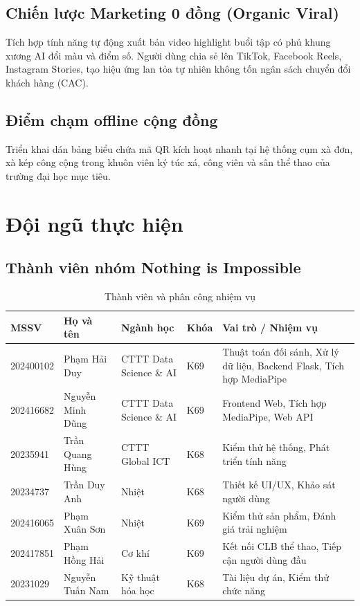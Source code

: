 \documentclass[a4paper,12pt]{article}
\begin{document}
\subsection{Chiến lược Marketing 0 đồng (Organic Viral)}
Tích hợp tính năng tự động xuất bản video highlight buổi tập có phủ khung xương AI đổi màu và điểm số. Người dùng chia sẻ lên TikTok, Facebook Reels, Instagram Stories, tạo hiệu ứng lan tỏa tự nhiên không tốn ngân sách chuyển đổi khách hàng (CAC).

\subsection{Điểm chạm offline cộng đồng}
Triển khai dán bảng biểu chứa mã QR kích hoạt nhanh tại hệ thống cụm xà đơn, xà kép công cộng trong khuôn viên ký túc xá, công viên và sân thể thao của trường đại học mục tiêu.

\section{Đội ngũ thực hiện}

\subsection{Thành viên nhóm Nothing is Impossible}
\begin{table}[H]
    \centering
    \caption{Thành viên và phân công nhiệm vụ}
    \label{tab:team}
    \begin{tabular}{p{1.8cm}p{2.5cm}p{2.8cm}p{1cm}p{5.5cm}}
        \toprule
        \textbf{MSSV} & \textbf{Họ và tên} & \textbf{Ngành học} & \textbf{Khóa} & \textbf{Vai trò / Nhiệm vụ} \\
        \midrule
        202400102 & Phạm Hải Duy & CTTT Data Science \& AI & K69 & Thuật toán đối sánh, Xử lý dữ liệu, Backend Flask, Tích hợp MediaPipe \\
        202416682 & Nguyễn Minh Dũng & CTTT Data Science \& AI & K69 & Frontend Web, Tích hợp MediaPipe, Web API \\
        20235941  & Trần Quang Hùng & CTTT Global ICT & K68 & Kiểm thử hệ thống, Phát triển tính năng \\
        20234737  & Trần Duy Anh & Nhiệt & K68 & Thiết kế UI/UX, Khảo sát người dùng \\
        202416065 & Phạm Xuân Sơn & Nhiệt & K69 & Kiểm thử sản phẩm, Đánh giá trải nghiệm \\
        202417851 & Phạm Hồng Hải & Cơ khí & K69 & Kết nối CLB thể thao, Tiếp cận người dùng đầu \\
        20231029  & Nguyễn Tuấn Nam & Kỹ thuật hóa học & K68 & Tài liệu dự án, Kiểm thử chức năng \\
        \bottomrule
    \end{tabular}
\end{table}
\end{document}

